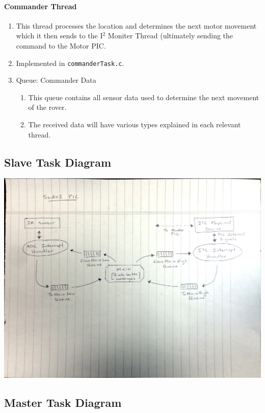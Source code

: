 \paragraph*{Commander Thread}
\begin{enumerate}
	\item This thread processes the location and determines the next motor movement which it then sends to the I$^2$ Moniter Thread (ultimately sending the command to the Motor PIC.
	\item Implemented in \texttt{commanderTask.c}.
	\item Queue: Commander Data
	\begin{enumerate}
		\item This queue contains all sensor data used to determine the next movement of the rover.
		\item The received data will have various types explained in each relevant thread.
	\end{enumerate}
\end{enumerate}

\subsection*{Slave Task Diagram}

\begin{center}
	\includegraphics[scale=0.45]{Images/SlaveTaskDiagram}
\end{center}

\subsection*{Master Task Diagram}

